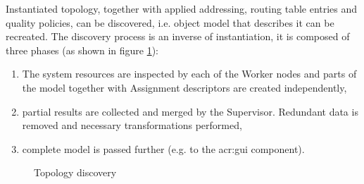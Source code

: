\documentclass[11pt,openany]{book}
\begin{document}
          Instantiated topology, together with applied addressing, routing table entries and quality policies, can be
          discovered, i.e. object model that describes it can be recreated. The discovery process is an inverse of
          instantiation, it is composed of three phases (as shown in figure \ref{fig:arch:seqdis}):

          \begin{enumerate}

            \item The system resources are inspected by each of the Worker nodes and parts of the model together with
                  Assignment descriptors are created independently,

            \item partial results are collected and merged by the Supervisor. Redundant data is removed and necessary
                  transformations performed,

            \item complete model is passed further (e.g. to the \gls{acr:gui} component).
          
          \end{enumerate}

          \begin{figure}[H]

            \centering


            \caption{Topology discovery}
            \label{fig:arch:seqdis}
          
          \end{figure}
\end{document}
